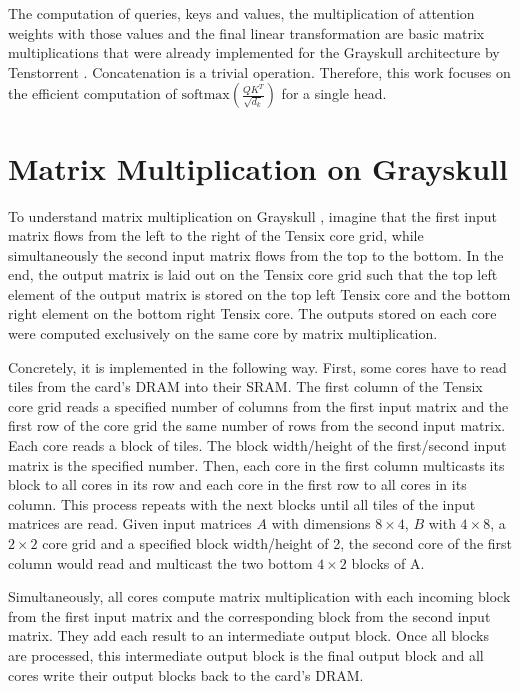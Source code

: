 \documentclass[conference]{IEEEtran}
\begin{document}
The computation of queries, keys and values, the multiplication of attention weights with those values and the final linear transformation are basic matrix multiplications that were already implemented for the Grayskull architecture by Tenstorrent \cite{mm-implementation}. Concatenation is a trivial operation. Therefore, this work focuses on the efficient computation of \(\text{softmax}\left(\frac{Q K^T}{\sqrt{d_k}}\right)\) for a single head.

\section{Matrix Multiplication on Grayskull}
\label{sec:matrix_multiplication}
To understand matrix multiplication on Grayskull \cite{mm-implementation}, imagine that the first input matrix flows from the left to the right of the Tensix core grid, while simultaneously the second input matrix flows from the top to the bottom. In the end, the output matrix is laid out on the Tensix core grid such that the top left element of the output matrix is stored on the top left Tensix core and the bottom right element on the bottom right Tensix core. The outputs stored on each core were computed exclusively on the same core by matrix multiplication. 

Concretely, it is implemented in the following way. First, some cores have to read tiles from the card's DRAM into their SRAM. The first column of the Tensix core grid reads a specified number of columns from the first input matrix and the first row of the core grid the same number of rows from the second input matrix. Each core reads a block of tiles. The block width/height of the first/second input matrix is the specified number. Then, each core in the first column multicasts its block to all cores in its row and each core in the first row to all cores in its column. This process repeats with the next blocks until all tiles of the input matrices are read. Given input matrices \(A\) with dimensions \(8 \times 4\), \(B\) with \(4 \times 8\), a \(2 \times 2\) core grid and a specified block width/height of 2, the second core of the first column would read and multicast the two bottom \(4 \times 2\) blocks of A.

Simultaneously, all cores compute matrix multiplication with each incoming block from the first input matrix and the corresponding block from the second input matrix. They add each result to an intermediate output block. Once all blocks are processed, this intermediate output block is the final output block and all cores write their output blocks back to the card's DRAM.
\end{document}
